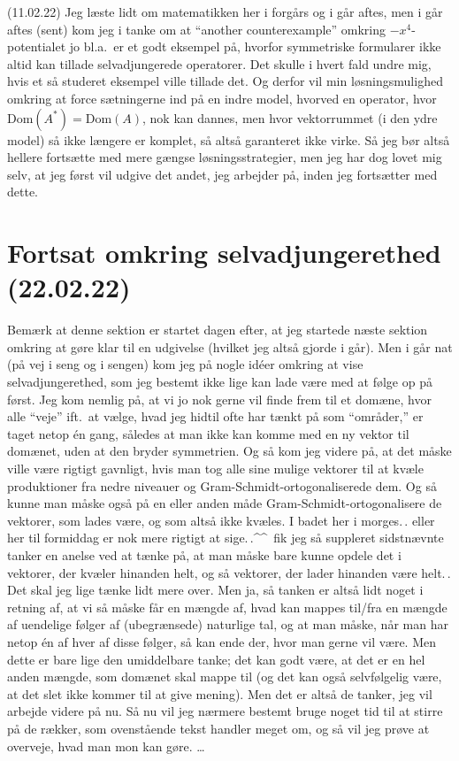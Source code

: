 \documentclass{report}
\begin{document}
(11.02.22) Jeg læste lidt om matematikken her i forgårs og i går aftes, men i går aftes (sent) kom jeg i tanke om at ``another counterexample'' omkring $-x^4$-potentialet jo bl.a.\ er et godt eksempel på, hvorfor symmetriske formularer ikke altid kan tillade selvadjungerede operatorer. Det skulle i hvert fald undre mig, hvis et så studeret eksempel ville tillade det. Og derfor vil min løsningsmulighed omkring at force sætningerne ind på en indre model, hvorved en operator, hvor $\mathrm{Dom}(A^*) = \mathrm{Dom}(A)$, nok kan dannes, men hvor vektorrummet (i den ydre model) så ikke længere er komplet, så altså garanteret ikke virke. Så jeg bør altså hellere fortsætte med mere gængse løsningsstrategier, men jeg har dog lovet mig selv, at jeg først vil udgive det andet, jeg arbejder på, inden jeg fortsætter med dette. 





\section{Fortsat omkring selvadjungerethed (22.02.22)}
Bemærk at denne sektion er startet dagen efter, at jeg startede næste sektion omkring at gøre klar til en udgivelse (hvilket jeg altså gjorde i går). Men i går nat (på vej i seng og i sengen) kom jeg på nogle idéer omkring at vise selvadjungerethed, som jeg bestemt ikke lige kan lade være med at følge op på først. Jeg kom nemlig på, at vi jo nok gerne vil finde frem til et domæne, hvor alle ``veje'' ift.\ at vælge, hvad jeg hidtil ofte har tænkt på som ``områder,'' er taget netop én gang, således at man ikke kan komme med en ny vektor til domænet, uden at den bryder symmetrien. Og så kom jeg videre på, at det måske ville være rigtigt gavnligt, hvis man tog alle sine mulige vektorer til at kvæle produktioner fra nedre niveauer og Gram-Schmidt-ortogonaliserede dem. Og så kunne man måske også på en eller anden måde Gram-Schmidt-ortogonalisere de vektorer, som lades være, og som altså ikke kvæles. I badet her i morges.\,. eller her til formiddag er nok mere rigtigt at sige.\,.\textasciicircum\textasciicircum\ fik jeg så suppleret sidstnævnte tanker en anelse ved at tænke på, at man måske bare kunne opdele det i vektorer, der kvæler hinanden helt, og så vektorer, der lader hinanden være helt.\,. Det skal jeg lige tænke lidt mere over. Men ja, så tanken er altså lidt noget i retning af, at vi så måske får en mængde af, hvad kan mappes til/fra en mængde af uendelige følger af (ubegrænsede) naturlige tal, og at man måske, når man har netop én af hver af disse følger, så kan ende der, hvor man gerne vil være. Men dette er bare lige den umiddelbare tanke; det kan godt være, at det er en hel anden mængde, som domænet skal mappe til (og det kan også selvfølgelig være, at det slet ikke kommer til at give mening). Men det er altså de tanker, jeg vil arbejde videre på nu. Så nu vil jeg nærmere bestemt bruge noget tid til at stirre på de rækker, som ovenstående tekst handler meget om, og så vil jeg prøve at overveje, hvad man mon kan gøre. \ldots 
\end{document}
